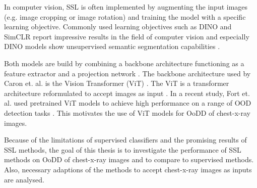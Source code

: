 In computer vision, SSL is often implemented by augmenting the input images (e.g. image cropping or image rotation) and training the model with a specific learning objective.
Commonly used learning objectives such as DINO \citep{Caron2021} and SimCLR \citep{Chen2020} report impressive results in the field of computer vision and especially DINO models show unsupervised semantic segmentation capabilities \citep{Caron2021}.
\par
Both models are build by combining a backbone architecture functioning as a feature extractor and a projection network \citep{Caron2021,Chen2020}. 
The backbone architecture used by Caron et. al. is the Vision Transformer (ViT) \citep{Caron2021}.
The ViT is a transformer architecture \citep{Vaswani2017} reformulated to accept images as input \citep{Dosovitskiy2020}.
In a recent study, Fort et. al. used pretrained ViT models to achieve high performance on a range of OOD detection tasks \citep{Fort2021}.
This motivates the use of ViT models for OoDD of chest-x-ray images.
\par
Because of the limitations of supervised classifiers and the promising results of SSL methods, the goal of this thesis is to investigate the performance of SSL methods on OoDD of chest-x-ray images and to compare to supervised methods.
Also, necessary adaptions of the methods to accept chest-x-ray images as inputs are analysed. 